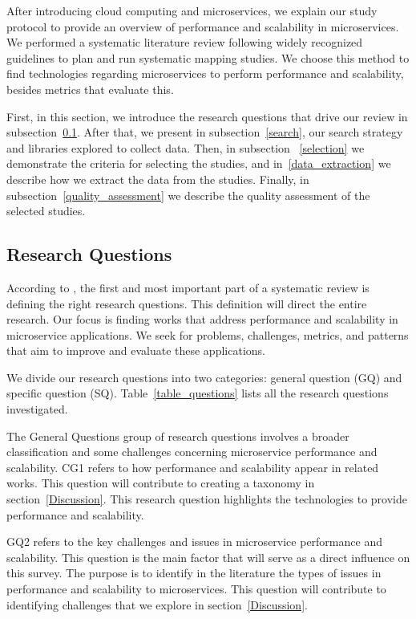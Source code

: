 

After introducing cloud computing and microservices, we explain our study protocol to provide an overview of performance and scalability in microservices. We performed a systematic literature review following widely recognized guidelines \cite{Petticrew2006SystematicSciences} to plan and run systematic mapping studies. We choose this method to find technologies regarding microservices to perform performance and scalability, besides metrics that evaluate this.

First, in this section, we introduce the research questions that drive our review in subsection~\ref{questions}. After that, we present in subsection~\ref{search}, our search strategy and libraries explored to collect data. Then, in subsection ~\ref{selection} we demonstrate the criteria for selecting the studies, and in~\ref{data_extraction} we describe how we extract the data from the studies. Finally, in subsection~\ref{quality_assessment} we describe the quality assessment of the selected studies.

\subsection{Research Questions}
\label{questions}
According to \cite{Petticrew2006SystematicSciences}, the first and most important part of a systematic review is defining the right research questions. This definition will direct the entire research. Our focus is finding works that address performance and scalability in microservice applications. We seek for problems, challenges, metrics, and patterns that aim to improve and evaluate these applications.


We divide our research questions into two categories: general question (GQ) and specific question (SQ). Table~\ref{table_questions} lists all the research questions investigated.

The General Questions group of research questions involves a broader classification and some challenges concerning microservice performance and scalability. CG1 refers to how performance and scalability appear in related works. This question will contribute to creating a taxonomy in section~\ref{Discussion}. This research question highlights the technologies to provide performance and scalability.

GQ2 refers to the key challenges and issues in microservice performance and scalability. This question is the main factor that will serve as a direct influence on this survey. The purpose is to identify in the literature the types of issues in performance and scalability to microservices. This question will contribute to identifying challenges that we explore in section~\ref{Discussion}.

